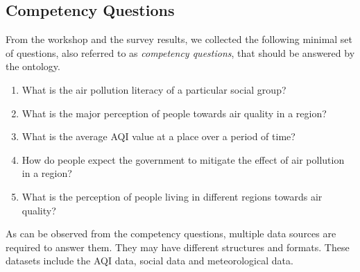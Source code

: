 


\subsection{Competency Questions}

From the workshop and the survey results, we collected the following minimal set of questions, also referred to as \emph{competency questions}, that should be answered by the ontology.


\begin{enumerate}
    \item What is the air pollution literacy of a particular social group?
    \item What is the major perception of people towards air quality in a region?
    \item What is the average AQI value at a place over a period of time?
    \item How do people expect the government to mitigate the effect of air pollution in a region?
    \item What is the perception of people living in different regions towards air quality?
\end{enumerate}

As can be observed from the competency questions, multiple data sources are required to answer them. They may have different structures and formats. These datasets include the AQI data, social data and meteorological data. %

